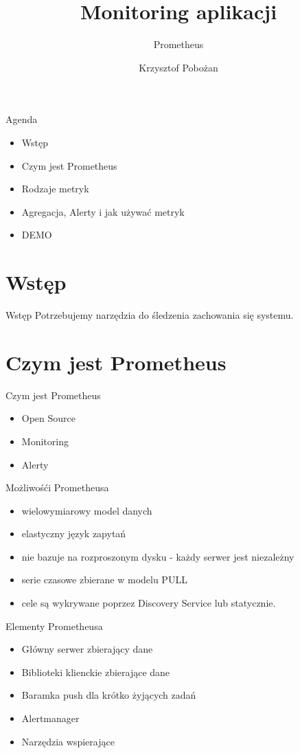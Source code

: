 \documentclass[epic,eepic,aspectratio=169,12pt]{beamer}
\begin{document}
	\title{Monitoring aplikacji}
	\subtitle{Prometheus}
	\author{Krzysztof Pobożan}
\begin{frame}
	\maketitle
\end{frame}
\begin{frame}{Agenda}
	\begin{itemize}
		\item Wstęp
		\item Czym jest Prometheus
		\item Rodzaje metryk
		\item Agregacja, Alerty i jak używać metryk
		\item DEMO
	\end{itemize}
\end{frame}
\section{Wstęp}
\begin{frame}{Wstęp}
	Potrzebujemy narzędzia do śledzenia zachowania się systemu.
\end{frame}
\section{Czym jest Prometheus}
\begin{frame}{Czym jest Prometheus}
	\begin{itemize}
		\item Open Source \pause
		\item Monitoring \pause		
		\item Alerty
	\end{itemize}
\end{frame}
\begin{frame}{Możliwośći Prometheusa}
	\begin{itemize}
		\item  wielowymiarowy model danych
		\item  elastyczny język zapytań
		\item nie bazuje na rozproszonym dysku - każdy serwer jest niezależny
		\item serie czasowe zbierane w modelu PULL
		\item cele są wykrywane poprzez Discovery Service lub statycznie.
	\end{itemize}
\end{frame}
\begin{frame}{Elementy Prometheusa}
	\begin{itemize}
		\item Główny serwer zbierający dane
		\item Biblioteki klienckie zbierające dane
		\item Baramka push dla krótko żyjących zadań
		\item Alertmanager
		\item Narzędzia wspierające
	\end{itemize}
\end{frame}
\end{document}
